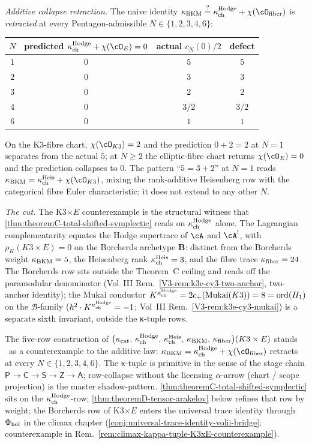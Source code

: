 \begin{remark}
\emph{Additive collapse retraction.} The naive identity
$\kappaBKM \stackrel{?}{=} \kappaChHodge +
\chi(\cO_{\mathrm{fiber}})$ is \emph{retracted} at every
Pentagon-admissible $N \in \{1, 2, 3, 4, 6\}$:
\begin{center}
\renewcommand{\arraystretch}{1.2}
\begin{tabular}{c|c|c|c}
$N$ & predicted $\kappaChHodge + \chi(\cO_E) = 0$ & actual $c_N(0)/2$ & defect \\
\hline
$1$ & $0$ & $5$ & $5$ \\
$2$ & $0$ & $3$ & $3$ \\
$3$ & $0$ & $2$ & $2$ \\
$4$ & $0$ & $3/2$ & $3/2$ \\
$6$ & $0$ & $1$ & $1$ \\
\end{tabular}
\end{center}
On the K3-fibre chart, $\chi(\cO_{K3}) = 2$ and the prediction
$0 + 2 = 2$ at $N = 1$ separates from the actual $5$; at
$N \ge 2$ the elliptic-fibre chart returns $\chi(\cO_E) = 0$ and
the prediction collapses to $0$. The pattern ``$5 = 3 + 2$'' at
$N = 1$ reads $\kappaBKM = \kappaChHeis + \chi(\cO_{K3})$,
mixing the rank-additive Heisenberg row with the categorical fibre
Euler characteristic; it does not extend to any other $N$.

\emph{The cut.} The K3$\times E$ counterexample is the structural
witness that \cref{thm:theoremC-total-shifted-symplectic} reads on
$\kappa_{\mathrm{ch}}^{\mathrm{Hodge}}$ alone. The Lagrangian complementarity equates the
Hodge supertrace of $\cA$ and $\cA^!$, with
$\rho_K(K3 \times E) = 0$ on the Borcherds archetype
$\mathbf{B}$: distinct from the Borcherds weight
$\kappa_{\mathrm{BKM}} = 5$, the Heisenberg rank $\kappa_{\mathrm{ch}}^{\mathrm{Heis}} = 3$, and the
fibre trace $\kappa_{\mathrm{fiber}} = 24$. The Borcherds row sits outside the
Theorem~C ceiling and reads off the paramodular denominator
(Vol~III Rem.~\ref*{V3-rem:k3e-cy3-two-anchor}, two-anchor
identity); the Mukai conductor
$K^{\kappa_{\mathrm{ch}}^{\mathrm{Hodge}}} = 2 c_+(\mathrm{Mukai}(K3)) = 8 = \mathrm{ord}(H_1)$ on
the $\mathcal B$-family ($\hbar^2 \cdot K^{\kappa_{\mathrm{ch}}^{\mathrm{Hodge}}} = -1$;
Vol~III Rem.~\ref*{V3-rem:k3e-cy3-mukai}) is a separate sixth
invariant, outside the κ-tuple rows.

The five-row construction of $\bigl(\kappa_{\mathrm{cat}},\, \kappa_{\mathrm{ch}}^{\mathrm{Hodge}},\, \kappa_{\mathrm{ch}}^{\mathrm{Heis}},\, \kappa_{\mathrm{BKM}},\, \kappa_{\mathrm{fiber}}\bigr)(K3 \times E)$ stands
\ClaimStatusProvedHere\ as a counterexample to the additive law:
$\kappaBKM = \kappaChHodge + \chi(\cO_{\mathrm{fiber}})$ retracts
at every $N \in \{1, 2, 3, 4, 6\}$. The κ-tuple is primitive in
the sense of the stage chain
$\mathsf{P} \to \mathsf{C} \to \mathsf{S} \to \mathsf{Z} \to
\mathsf{A}$; row-collapse without the licensing $\alpha$-arrow
(chart / scope projection) is the master shadow-pattern.
\cref{thm:theoremC-total-shifted-symplectic} sits on the
$\kappa_{\mathrm{ch}}^{\mathrm{Hodge}}$-row;
\cref{thm:theoremD-tensor-arakelov} below refines that row by
weight; the Borcherds row of K3$\times E$ enters the universal
trace identity through $\Phi_{\mathrm{hol}}$ in the climax chapter
(\cref{conj:universal-trace-identity-volii-bridge}; counterexample in
Rem.~\ref*{rem:climax-kappa-tuple-K3xE-counterexample}).
\end{remark}

